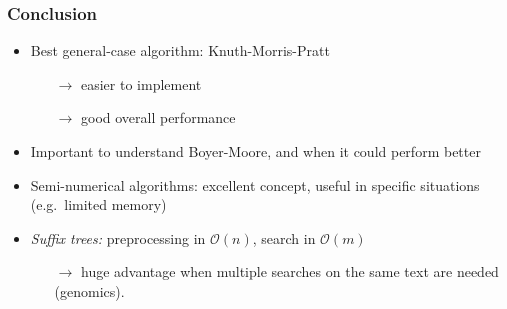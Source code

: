 \documentclass{beamer}
\begin{document}
\begin{frame}
  \frametitle{Conclusion}

  \begin{itemize}
  \item Best general-case algorithm: Knuth-Morris-Pratt
    \begin{itemize}
    \item[$\rightarrow$] easier to implement
    \item[$\rightarrow$] good overall performance
    \end{itemize}
  \item Important to understand Boyer-Moore, and when it could perform
    better
  \item Semi-numerical algorithms: excellent concept, useful in
    specific situations (e.g.\ limited memory)
  \item \emph{Suffix trees:} preprocessing in $\mathcal{O}(n)$, search
    in $\mathcal{O}(m)$
    \begin{itemize}
    \item[$\rightarrow$] huge advantage when multiple searches on the
      same text are needed (genomics).
    \end{itemize}
  \end{itemize}
\end{frame}
\end{document}
